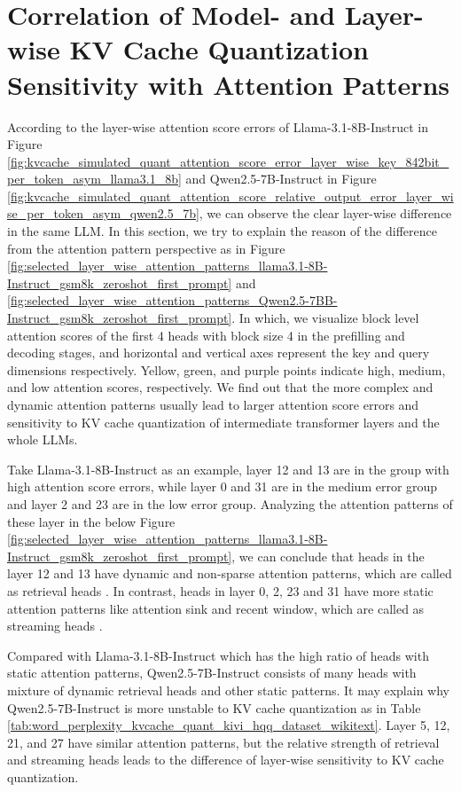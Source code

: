 \section{Correlation of Model- and Layer-wise KV Cache Quantization Sensitivity with Attention Patterns}
\label{sec:correlation_kvcache_sensitivity_attention_patterns}
According to the layer-wise attention score errors of Llama-3.1-8B-Instruct in Figure \ref{fig:kvcache_simulated_quant_attention_score_error_layer_wise_key_842bit_per_token_asym_llama3.1_8b} and Qwen2.5-7B-Instruct in Figure \ref{fig:kvcache_simulated_quant_attention_score_relative_output_error_layer_wise_per_token_asym_qwen2.5_7b}, we can observe the clear layer-wise difference in the same LLM. In this section, we try to explain the reason of the difference from the attention pattern perspective as in Figure \ref{fig:selected_layer_wise_attention_patterns_llama3.1-8B-Instruct_gsm8k_zeroshot_first_prompt} and \ref{fig:selected_layer_wise_attention_patterns_Qwen2.5-7BB-Instruct_gsm8k_zeroshot_first_prompt}. In which, we visualize block level attention scores of the first 4 heads with block size 4 in the prefilling and decoding stages, and horizontal and vertical axes represent the key and query dimensions respectively. Yellow, green, and purple points indicate high, medium, and low attention scores, respectively. We find out that the more complex and dynamic attention patterns usually lead to larger attention score errors and sensitivity to KV cache quantization of intermediate transformer layers and the whole LLMs.

Take Llama-3.1-8B-Instruct as an example, layer 12 and 13 are in the group with high attention score errors, while layer 0 and 31 are in the medium error group and layer 2 and 23 are in the low error group. Analyzing the attention patterns of these layer in the below Figure \ref{fig:selected_layer_wise_attention_patterns_llama3.1-8B-Instruct_gsm8k_zeroshot_first_prompt}, we can conclude that heads in the layer 12 and 13 have dynamic and non-sparse attention patterns, which are called as retrieval heads \cite{tang2024razorattention, xiao2024duoattention}. In contrast, heads in layer 0, 2, 23 and 31 have more static attention patterns like attention sink and recent window, which are called as streaming heads \cite{xiao2024duoattention, xiao2023streamingllm}.

Compared with Llama-3.1-8B-Instruct which has the high ratio of heads with static attention patterns, Qwen2.5-7B-Instruct consists of many heads with mixture of dynamic retrieval heads and other static patterns. It may explain why Qwen2.5-7B-Instruct is more unstable to KV cache quantization as in Table \ref{tab:word_perplexity_kvcache_quant_kivi_hqq_dataset_wikitext}. Layer 5, 12, 21, and 27 have similar attention patterns, but the relative strength of retrieval and streaming heads leads to the difference of layer-wise sensitivity to KV cache quantization.


